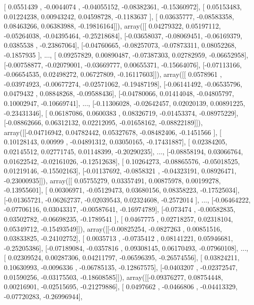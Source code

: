 \documentclass{article}
\begin{document}
       [ 0.0551439 , -0.0044074 , -0.04055152, -0.08382361, -0.15360972],
       [ 0.05153483,  0.01224238,  0.00943242,  0.04598728, -0.1183637 ],
       [ 0.03635777, -0.08583358,  0.08463266,  0.06383988, -0.19816164]]), array([[ 0.04279322,  0.05197112, -0.05264038, -0.04395464, -0.25218684],
       [-0.03658037, -0.08069451, -0.06169379,  0.0385538 , -0.23867064],
       [-0.04760665, -0.08257073, -0.07873311,  0.08052268, -0.1857935 ],
       ..., 
       [ 0.09257829,  0.00890487, -0.07387303,  0.02782959, -0.06652958],
       [-0.00758877, -0.02079001, -0.03669777,  0.00655371, -0.15664076],
       [-0.07113166, -0.06654535,  0.02498272,  0.06727809, -0.16117603]]), array([[ 0.0578961 , -0.03974923, -0.00677274, -0.02571062, -0.19487198],
       [-0.06141492, -0.06535796,  0.0479432 ,  0.08848268, -0.09588436],
       [-0.04780066,  0.01414048, -0.04805797,  0.10002947, -0.10669741],
       ..., 
       [-0.11306028, -0.02642457,  0.02020139,  0.00891225, -0.23431346],
       [ 0.06187086,  0.0600383 ,  0.08326719, -0.01453374, -0.08975229],
       [-0.08862666,  0.06312132,  0.02212095, -0.01658162, -0.08822189]]), array([[-0.04716942,  0.04782442,  0.05327678, -0.08482406, -0.1451566 ],
       [ 0.10128143,  0.00999   , -0.04891312,  0.03050165, -0.17431887],
       [ 0.02384205,  0.02145512,  0.02771745,  0.01148399, -0.20290235],
       ..., 
       [-0.08858194,  0.03066764,  0.01622542, -0.02161026, -0.12512638],
       [ 0.10264273, -0.08865576, -0.05018525,  0.01219146, -0.15502163],
       [-0.01137692, -0.0858321 , -0.04323191,  0.08926471, -0.23000935]]), array([[ 0.05755279,  0.03357491,  0.00875978,  0.00199278, -0.13955601],
       [ 0.00306971, -0.05129473,  0.03680156,  0.08358223, -0.17525034],
       [-0.01365721, -0.06262737, -0.02039543,  0.02324608, -0.2572014 ],
       ..., 
       [-0.06464222, -0.07706116,  0.03043317, -0.00587641, -0.16974789],
       [-0.073474  , -0.00582835,  0.03502782, -0.06698235, -0.1789541 ],
       [ 0.0467775 ,  0.02718257,  0.02318104,  0.05349712, -0.15493549]]), array([[-0.00825254, -0.0827263 ,  0.00851516,  0.03833825, -0.24102752],
       [ 0.0035713 , -0.0735412 ,  0.08141221,  0.05946681, -0.25205386],
       [-0.07189084, -0.0357816 ,  0.09308145,  0.06170493, -0.07960108],
       ..., 
       [ 0.02309524,  0.00287306,  0.04211797, -0.06596395, -0.26574556],
       [ 0.03824211,  0.10630993, -0.0096336 , -0.06785135, -0.12867575],
       [-0.0403207 , -0.02372547,  0.01590256, -0.03175503, -0.18608585]]), array([[-0.09376277,  0.08754448,  0.00216901, -0.02515695, -0.21279886],
       [ 0.0497662 , -0.0466806 , -0.04413329, -0.07720283, -0.26996944],
\end{document}
